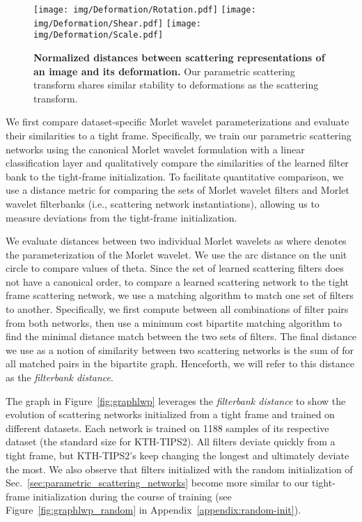 \documentclass[10pt,twocolumn,letterpaper]{article}
\begin{document}
\begin{figure*}
    \centering
    \texttt{[image: img/Deformation/Rotation.pdf]}
    \texttt{[image: img/Deformation/Shear.pdf]}
    \texttt{[image: img/Deformation/Scale.pdf]}
    \vspace{-15pt}
    \caption{\textbf{Normalized distances between scattering representations of an image and its deformation.} Our parametric scattering transform shares similar stability to deformations as the scattering transform.   }\label{fig:defo}
\vspace{-12pt}
\end{figure*}
We first compare dataset-specific Morlet wavelet parameterizations and evaluate their similarities to a tight frame. Specifically, we train our parametric scattering networks using the canonical Morlet wavelet formulation with a linear classification layer and qualitatively compare the similarities of the learned filter bank to the tight-frame initialization. To facilitate quantitative comparison, we use a distance metric for comparing the sets of Morlet wavelet filters and Morlet wavelet filterbanks (i.e., scattering network instantiations), allowing us to measure deviations from the tight-frame initialization. 

We evaluate distances between two individual Morlet wavelets as  where  denotes the parameterization of the Morlet wavelet. We use the arc distance on the unit circle to compare values of theta. Since the set of learned scattering filters does not have a canonical order, to compare a learned scattering network to the tight frame scattering network, we use a matching algorithm to match one set of filters to another. Specifically, we first compute  between all combinations of filter pairs from both networks, then use a minimum cost bipartite matching algorithm \cite{kuhn1955} to find the minimal distance match between the two sets of filters. The final distance we use as a notion of similarity between two scattering networks is the sum of  for all matched pairs in the bipartite graph. Henceforth, we will refer to this distance as the \textit{filterbank distance}. 







The graph in Figure~\ref{fig:graphlwp} leverages the \textit{filterbank distance} to show the evolution of scattering networks initialized from a tight frame and trained on different datasets. Each network is trained on 1188 samples of its respective dataset (the standard size for KTH-TIPS2). All filters deviate quickly from a tight frame, but KTH-TIPS2's keep changing the longest and ultimately deviate the most. We also observe that filters initialized with the random initialization of Sec.~\ref{sec:parametric_scattering_networks} become more similar to our tight-frame initialization during the course of training (see Figure~\ref{fig:graphlwp_random} in Appendix~\ref{appendix:random-init}). 
\end{document}
